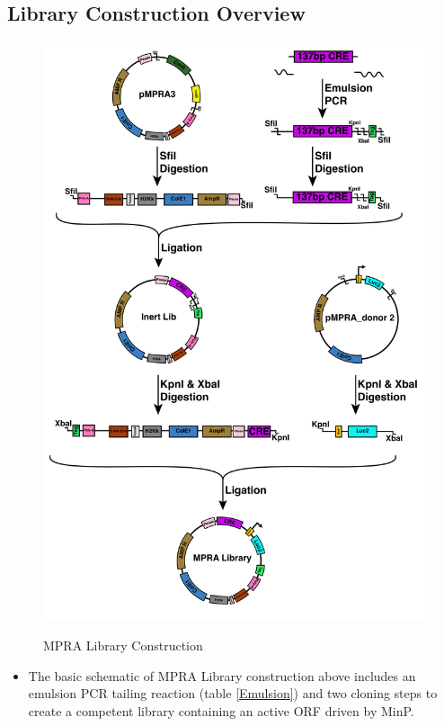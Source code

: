 \documentclass[a4paper]{article}
\begin{document}
	\subsection{Library Construction Overview}
    	\begin{figure}[H]
			\centering
			\includegraphics[width=.90\textwidth]{MPRA_LibConstruction.pdf}
			\label{fig:Construction}
			\caption{MPRA Library Construction}
        \end{figure}
        \begin{itemize}
                
            \item The basic schematic of MPRA Library construction above includes an emulsion PCR tailing reaction (table \ref{Emulsion}) and two cloning steps to create a competent library containing an active ORF driven by MinP.
                              
    	\end{itemize}
\end{document}
